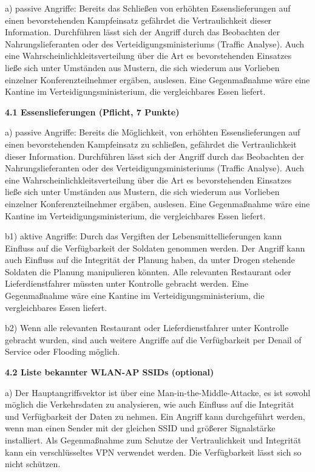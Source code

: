 \documentclass[ngerman]{fbi-aufgabenblatt}
\begin{document}
%
%
\newpage
{}

a) passive Angriffe: Bereits das Schließen von erhöhten Essenslieferungen auf einen bevorstehenden Kampfeinsatz gefährdet die Vertraulichkeit dieser Information. Durchführen lässt sich der Angriff durch das Beobachten der Nahrungslieferanten oder des Verteidigungsministeriums (Traffic Analyse). Auch eine Wahrscheinlichkleitsverteilung über die Art es bevorstehenden Einsatzes ließe sich unter Umständen aus Mustern, die sich wiederum aus Vorlieben einzelner Konferenzteilnehmer ergäben, auslesen. Eine Gegenmaßnahme wäre eine Kantine im Verteidigungsministerium, die vergleichbares Essen liefert.

\textbf{4.1 Essenslieferungen (Pflicht, 7 Punkte)}

a) passive Angriffe: Bereits die Möglichkeit, von erhöhten Essenslieferungen auf einen bevorstehenden Kampfeinsatz zu schließen, gefährdet die Vertraulichkeit dieser Information. Durchführen lässt sich der Angriff durch das Beobachten der Nahrungslieferanten oder des Verteidigungsministeriums (Traffic Analyse). Auch eine Wahrscheinlichkleitsverteilung über die Art es bevorstehenden Einsatzes ließe sich unter Umständen aus Mustern, die sich wiederum aus Vorlieben einzelner Konferenzteilnehmer ergäben, auslesen. Eine Gegenmaßnahme wäre eine Kantine im Verteidigungsministerium, die vergleichbares Essen liefert. 

b1) aktive Angriffe: Durch das Vergiften der Lebensmittellieferungen kann Einfluss auf die Verfügbarkeit der Soldaten genommen werden. Der Angriff kann auch Einfluss auf die Integrität der Planung haben, da unter Drogen stehende Soldaten die Planung manipulieren könnten. Alle relevanten Restaurant oder Lieferdienstfahrer müssten unter Kontrolle gebracht werden. Eine Gegenmaßnahme wäre eine Kantine im Verteidigungsministerium, die vergleichbares Essen liefert.
 
b2) Wenn alle relevanten Restaurant oder Lieferdienstfahrer unter Kontrolle gebracht wurden, sind auch weitere Angriffe auf die Verfügbarkeit per Denail of Service oder Flooding möglich.

\textbf{4.2 Liste bekannter WLAN-AP SSIDs (optional)}

a) Der Hauptangriffsvektor ist über eine Man-in-the-Middle-Attacke, es ist sowohl möglich die Verkehrsdaten zu analysieren, wie auch Einfluss auf die Integrität und Verfügbarkeit der Daten zu nehmen. Ein Angriff kann durchgeführt werden, wenn man einen Sender mit der gleichen SSID und größerer Signalstärke installiert.
Als Gegenmaßnahme zum Schutze der Vertraulichkeit und Integrität kann ein verschlüsseltes VPN verwendet werden. Die Verfügbarkeit lässt sich so nicht schützen.
\end{document}
